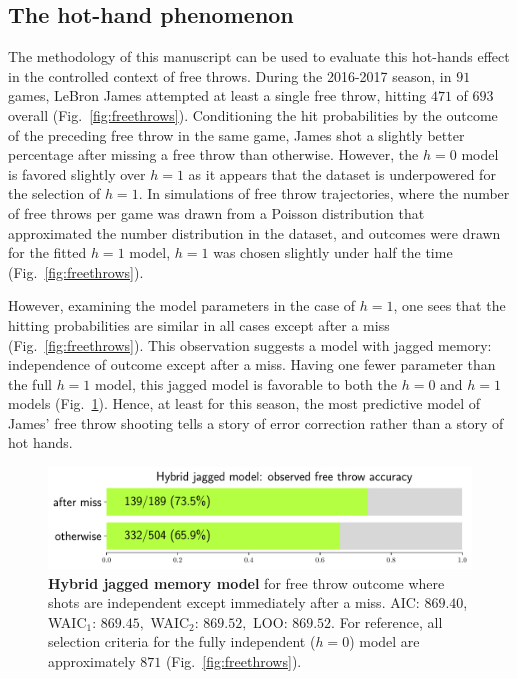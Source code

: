 \documentclass{IOS-Book-Article}
\begin{document}
\subsection{The hot-hand phenomenon} 

The methodology of this manuscript can be used to evaluate this hot-hands effect in the controlled context of free throws.
  During the 2016-2017 season, in $91$ games, LeBron James attempted at least a single free throw, hitting $471$ of $693$ overall (Fig.~\ref{fig:freethrows}).  Conditioning the hit probabilities by the outcome of the preceding free throw in the same game, James shot a slightly better percentage after missing a free throw than otherwise. However, the $h=0$ model is favored slightly over $h=1$ as it appears that the dataset is underpowered for the selection of $h=1$. In simulations of free throw trajectories, where the number of free throws per game was drawn from a Poisson distribution that approximated the number distribution in the dataset, and outcomes were drawn for the fitted $h=1$ model, $h=1$ was chosen slightly under half the time (Fig.~\ref{fig:freethrows}).
  
  However, examining the model parameters in the case of $h=1$, one sees that the hitting probabilities are similar in all cases except after a miss (Fig.~\ref{fig:freethrows}). This observation suggests  a  model with jagged memory: independence of outcome except after a miss. Having one fewer parameter than the full $h=1$ model, this jagged model is favorable to both the $h=0$ and $h=1$ models (Fig.~\ref{fig:fig5}). Hence, at least for this season, the most predictive model of  James' free throw shooting tells a story of error correction rather than a story of hot hands.
  

\begin{figure}
\includegraphics[width=\linewidth]{fig5}

\caption{\textbf{Hybrid jagged memory model} for free throw outcome where shots are independent except immediately after a miss. AIC: $869.40$, WAIC$_1$: $869.45,$ WAIC$_2$: $869.52,$ LOO: $869.52.$ For reference, all selection criteria for the fully independent ($h=0$) model are approximately $871$ (Fig.~\ref{fig:freethrows}).} 
\label{fig:fig5}
\end{figure}
\end{document}
